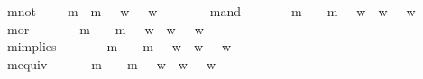 \begin{isabellebody}
\ mnot\ {\isacharcolon}{\isacharcolon}\ {\isachardoublequoteopen}{\isasymsigma}\ {\isasymRightarrow}\ {\isasymsigma}{\isachardoublequoteclose}\ {\isacharparenleft}{\isachardoublequoteopen}m{\isasymnot}{\isachardoublequoteclose}{\isacharparenright}\ \ {\isachardoublequoteopen}m{\isasymnot}\ {\isasymphi}\ {\isasymequiv}\ {\isacharparenleft}{\isasymlambda}w{\isachardot}\ {\isasymnot}\ {\isasymphi}\ w{\isacharparenright}{\isachardoublequoteclose}\ \ \ \ \isanewline
\ \ \isamarkupfalse%
\ mand\ {\isacharcolon}{\isacharcolon}\ {\isachardoublequoteopen}{\isasymsigma}\ {\isasymRightarrow}\ {\isasymsigma}\ {\isasymRightarrow}\ {\isasymsigma}{\isachardoublequoteclose}\ {\isacharparenleft}\ {\isachardoublequoteopen}m{\isasymand}{\isachardoublequoteclose}\ {}{}{\isacharparenright}\ \ {\isachardoublequoteopen}{\isasymphi}\ m{\isasymand}\ {\isasympsi}\ {\isasymequiv}\ {\isacharparenleft}{\isasymlambda}w{\isachardot}\ {\isasymphi}\ w\ {\isasymand}\ {\isasympsi}\ w{\isacharparenright}{\isachardoublequoteclose}\ \ \ \isanewline
\ \ \isamarkupfalse%
\ mor\ {\isacharcolon}{\isacharcolon}\ {\isachardoublequoteopen}{\isasymsigma}\ {\isasymRightarrow}\ {\isasymsigma}\ {\isasymRightarrow}\ {\isasymsigma}{\isachardoublequoteclose}\ {\isacharparenleft}\ {\isachardoublequoteopen}m{\isasymor}{\isachardoublequoteclose}\ {}{}{\isacharparenright}\ \ {\isachardoublequoteopen}{\isasymphi}\ m{\isasymor}\ {\isasympsi}\ {\isasymequiv}\ {\isacharparenleft}{\isasymlambda}w{\isachardot}\ {\isasymphi}\ w\ {\isasymor}\ {\isasympsi}\ w{\isacharparenright}{\isachardoublequoteclose}\ \ \ \isanewline
\ \ \isamarkupfalse%
\ mimplies\ {\isacharcolon}{\isacharcolon}\ {\isachardoublequoteopen}{\isasymsigma}\ {\isasymRightarrow}\ {\isasymsigma}\ {\isasymRightarrow}\ {\isasymsigma}{\isachardoublequoteclose}\ {\isacharparenleft}\ {\isachardoublequoteopen}m{\isasymrightarrow}{\isachardoublequoteclose}\ {}{}{\isacharparenright}\ \ {\isachardoublequoteopen}{\isasymphi}\ m{\isasymrightarrow}\ {\isasympsi}\ {\isasymequiv}\ {\isacharparenleft}{\isasymlambda}w{\isachardot}\ {\isasymphi}\ w\ {\isasymlongrightarrow}\ {\isasympsi}\ w{\isacharparenright}{\isachardoublequoteclose}\ \ \isanewline
\ \ \isamarkupfalse%
\ mequiv{\isacharcolon}{\isacharcolon}\ {\isachardoublequoteopen}{\isasymsigma}\ {\isasymRightarrow}\ {\isasymsigma}\ {\isasymRightarrow}\ {\isasymsigma}{\isachardoublequoteclose}\ {\isacharparenleft}\ {\isachardoublequoteopen}m{\isasymequiv}{\isachardoublequoteclose}\ {}{}{\isacharparenright}\ \ {\isachardoublequoteopen}{\isasymphi}\ m{\isasymequiv}\ {\isasympsi}\ {\isasymequiv}\ {\isacharparenleft}{\isasymlambda}w{\isachardot}\ {\isacharparenleft}{\isasymphi}\ w\ {\isasymlongleftrightarrow}\ {\isasympsi}\ w{\isacharparenright}{\isacharparenright}{\isachardoublequoteclose}\ \ \isanewline

\end{isabellebody}
